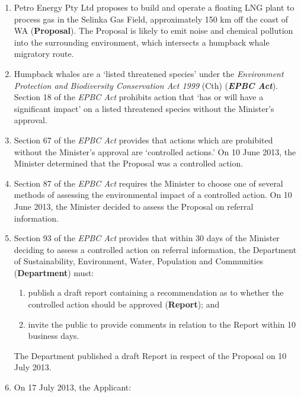 \documentclass[12pt]{article}
\begin{document}
\begin{enumerate}[1.]
\item
  Petro Energy Pty Ltd proposes to build and operate a floating LNG
  plant to process gas in the Selinka Gas Field, approximately 150 km
  off the coast of WA (\textbf{Proposal}). The Proposal is likely to
  emit noise and chemical pollution into the surrounding environment,
  which intersects a humpback whale migratory route.
\item
  Humpback whales are a `listed threatened species' under the
  \emph{Environment Protection and Biodiversity Conservation Act 1999}
  (Cth) (\textbf{\emph{EPBC Act}}). Section 18 of the \emph{EPBC Act}
  prohibits action that `has or will have a significant impact' on a
  listed threatened species without the Minister's approval.
\item
  Section 67 of the \emph{EPBC Act} provides that actions which are
  prohibited without the Minister's approval are `controlled actions.'
  On 10 June 2013, the Minister determined that the Proposal was a
  controlled action.
\item
  Section 87 of the \emph{EPBC Act} requires the Minister to choose one
  of several methods of assessing the environmental impact of a
  controlled action. On 10 June 2013, the Minister decided to assess the
  Proposal on referral information.
\item
  Section 93 of the \emph{EPBC Act} provides that within 30 days of the
  Minister deciding to assess a controlled action on referral
  information, the Department of Sustainability, Environment, Water,
  Population and Communities (\textbf{Department}) must:

  \begin{enumerate}
  \item
    publish a draft report containing a recommendation as to whether the
    controlled action should be approved (\textbf{Report}); and
  \item
    invite the public to provide comments in relation to the Report
    within 10 business days.
  \end{enumerate}

  The Department published a draft Report in respect of the Proposal on
  10 July 2013.
\item
  On 17 July 2013, the Applicant:


\end{enumerate}
\end{document}
